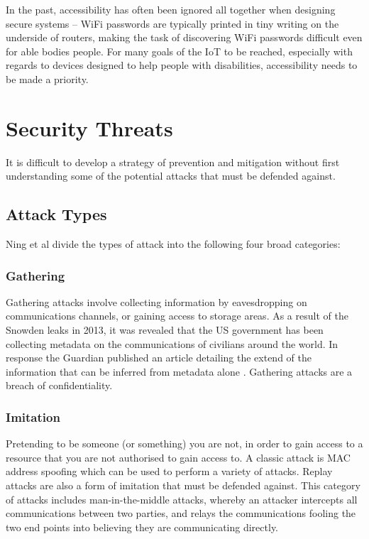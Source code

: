\documentclass[10pt,journal,compsoc]{IEEEtran}
\begin{document}
In the past, accessibility has often been ignored all together when designing
secure systems -- WiFi passwords are typically printed in tiny writing on the
underside of routers, making the task of discovering WiFi passwords difficult
even for able bodies people. For many goals of the IoT to be reached,
especially with regards to devices designed to help people with disabilities,
accessibility needs to be made a priority.  


\section{Security Threats}
It is difficult to develop a strategy of prevention and mitigation without
first understanding some of the potential attacks that must be defended
against.  

\subsection{Attack Types}
Ning et al \cite{Ning2013} divide the types of attack into the following
four broad categories:

\subsubsection{Gathering}
Gathering attacks involve collecting information by eavesdropping on
communications channels, or gaining access to storage areas. As a result of the
Snowden leaks in 2013, it was revealed that the US government has been
collecting metadata on the communications of civilians around the world. In
response the Guardian published an article detailing the extend of the
information that can be inferred from metadata alone \cite{Guardian2013}.
Gathering attacks are a breach of confidentiality. 

\subsubsection{Imitation}
Pretending to be someone (or something) you are not, in order to gain access to
a resource that you are not authorised to gain access to. A classic attack is
MAC address spoofing which can be used to perform a variety of attacks. Replay
attacks are also a form of imitation that must be defended against. This
category of attacks includes man-in-the-middle attacks, whereby an attacker
intercepts all communications between two parties, and relays the
communications fooling the two end points into believing they are communicating
directly. 
\end{document}
